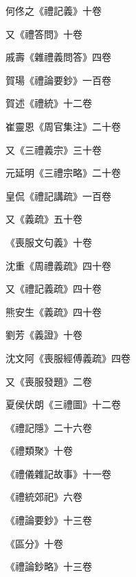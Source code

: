\begin{pinyinscope}
 何佟之《禮記義》十卷



 又《禮答問》十卷



 戚壽《雜禮義問答》四卷



 賀瑒《禮論要鈔》一百卷



 賀述《禮統》十二卷



 崔靈恩《周官集注》二十卷



 又《三禮義宗》三十卷



 元延明《三禮宗略》二十卷



 皇侃《禮記講疏》一百卷



 又《義疏》五十卷



 《喪服文句義》十卷



 沈重《周禮義疏》四十卷



 又《禮記義疏》四十卷



 熊安生《義疏》四十卷



 劉芳《義證》十卷



 沈文阿《喪服經傅義疏》四卷



 又《喪服發題》二卷



 夏侯伏朗《三禮圖》十二卷



 《禮記隱》二十六卷



 《禮類聚》十卷



 《禮儀雜記故事》十一卷



 《禮統郊祀》六卷



 《禮論要鈔》十三卷



 《區分》十卷



 《禮論鈔略》十三卷




\end{pinyinscope}
